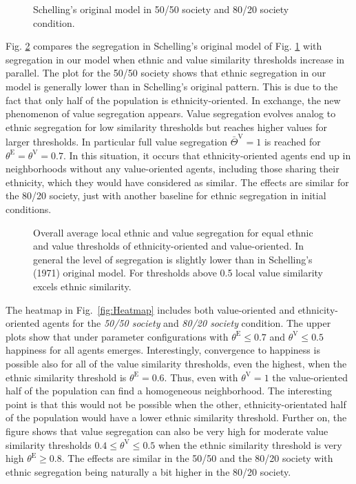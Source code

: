 \documentclass{ws-acs}
\begin{document}
{\begin{figure}[th]
\centerline{}
\vspace*{8pt}
\caption{Schelling's original model in 50/50 society and 80/20 society condition.}
\label{fig:OrigSchelling} 
\end{figure}

Fig. \ref{fig:OverallSegregation} compares the segregation in Schelling's original model of Fig. \ref{fig:OrigSchelling} with segregation in our model when ethnic and value similarity thresholds increase in parallel. The plot for the 50/50 society shows that ethnic segregation in our model is generally lower than in Schelling's original pattern. This is due to the fact that only half of the population is ethnicity-oriented. In exchange, the new phenomenon of value segregation appears. Value segregation evolves analog to ethnic segregation for low similarity thresholds but reaches higher values for larger thresholds. In particular full value segregation $\bar\Theta^\text{V} = 1$ is reached for $\theta^\text{E} = \theta^\text{V}=0.7$. In this situation, it occurs that ethnicity-oriented agents end up in neighborhoods without any value-oriented agents, including those sharing their ethnicity, which they would have considered as similar. The effects are similar for the 80/20 society, just with another baseline for ethnic segregation in initial conditions.

\begin{figure}[th]
\centerline{}
\vspace*{8pt}
\caption{Overall average local ethnic and value segregation for equal ethnic and value thresholds of ethnicity-oriented and value-oriented. In general the level of segregation is slightly lower than in Schelling's (1971)  original model. For thresholds above 0.5 local value similarity excels ethnic similarity.} 
\label{fig:OverallSegregation}
\end{figure}

The heatmap in Fig.~\ref{fig:Heatmap} includes both value-oriented and ethnicity-oriented agents for the {\it 50/50 society} and {\it 80/20 society} condition. The upper plots show that under parameter configurations with $\theta^\text{E} \leq 0.7$ and $\theta^\text{V} \leq 0.5$ happiness for all agents emerges. Interestingly, convergence to happiness is possible also for all of the value similarity thresholds, even the highest, when the ethnic similarity threshold is $\theta^\text{E} = 0.6$. Thus, even with  $\theta^\text{V} = 1$ the value-oriented half of the population can find a homogeneous neighborhood. The interesting point is that this would not be possible when the other, ethnicity-orientated half of the population would have a lower ethnic similarity threshold. Further on, the figure shows that value segregation can also be very high for moderate value similarity thresholds $0.4 \leq \theta^\text{V} \leq 0.5$ when the ethnic similarity threshold is very high $\theta^\text{E} \geq 0.8$. The effects are similar in the 50/50 and the 80/20 society with ethnic segregation being naturally a bit higher in the 80/20 society. 

}
\end{document}
